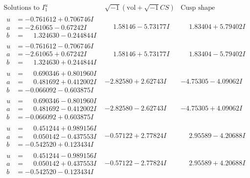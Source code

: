 \documentclass[1p]{elsarticle_modified}
\theoremstyle{definition}
\newcommand{\I}{\sqrt{-1}}
\begin{document}
$$\begin{array}{c|c|c}  
\text{Solutions to }I^u_{1}& \I (\text{vol} + \sqrt{-1}CS) & \text{Cusp shape}\\
 \hline 
\begin{aligned}
u &= -0.761612 + 0.706746 I \\
a &= -2.61065 - 0.67242 I \\
b &= \phantom{-}1.324630 - 0.244844 I\end{aligned}
 & \phantom{-}1.58146 - 5.73177 I & \phantom{-}1.83404 + 5.79402 I \\ \hline\begin{aligned}
u &= -0.761612 - 0.706746 I \\
a &= -2.61065 + 0.67242 I \\
b &= \phantom{-}1.324630 + 0.244844 I\end{aligned}
 & \phantom{-}1.58146 + 5.73177 I & \phantom{-}1.83404 - 5.79402 I \\ \hline\begin{aligned}
u &= \phantom{-}0.690346 + 0.801960 I \\
a &= \phantom{-}0.481692 + 0.412002 I \\
b &= -0.066092 - 0.603875 I\end{aligned}
 & -2.82580 + 2.62743 I & -4.75305 - 4.09062 I \\ \hline\begin{aligned}
u &= \phantom{-}0.690346 - 0.801960 I \\
a &= \phantom{-}0.481692 - 0.412002 I \\
b &= -0.066092 + 0.603875 I\end{aligned}
 & -2.82580 - 2.62743 I & -4.75305 + 4.09062 I \\ \hline\begin{aligned}
u &= \phantom{-}0.451244 + 0.989156 I \\
a &= \phantom{-}0.050142 - 0.437553 I \\
b &= -0.542520 + 0.123434 I\end{aligned}
 & -0.57122 + 2.77824 I & \phantom{-}2.95589 - 4.20688 I \\ \hline\begin{aligned}
u &= \phantom{-}0.451244 - 0.989156 I \\
a &= \phantom{-}0.050142 + 0.437553 I \\
b &= -0.542520 - 0.123434 I\end{aligned}
 & -0.57122 - 2.77824 I & \phantom{-}2.95589 + 4.20688 I \\ \hline\begin{aligned}

\end{aligned}
\end{array}$$
\end{document}
